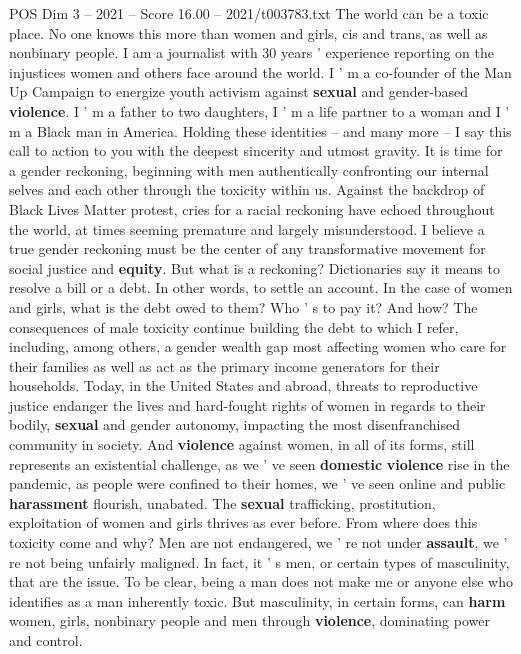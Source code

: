 \begin{textsample}{POS Dim 3 – 2021 – Score 16.00 – 2021/t003783.txt}  \label{ex:f3_pos_029}
The world can be a toxic place.
No one knows this more than women and girls, cis and trans, as well as nonbinary people.
I am a journalist with 30 years ' experience reporting on the injustices women and others face around the world.
I ' m a co-founder of the Man Up Campaign to energize youth activism against \textbf{sexual} and gender-based \textbf{violence}.
I ' m a father to two daughters, I ' m a life partner to a woman and I ' m a Black man in America.
Holding these identities -- and many more -- I say this call to action to you with the deepest sincerity and utmost gravity.
It is time for a gender reckoning, beginning with men authentically confronting our internal selves and each other through the toxicity within us.
Against the backdrop of Black Lives Matter protest, cries for a racial reckoning have echoed throughout the world, at times seeming premature and largely misunderstood.
I believe a true gender reckoning must be the center of any transformative movement for social justice and \textbf{equity}.
But what is a reckoning?
Dictionaries say it means to resolve a bill or a debt.
In other words, to settle an account.
In the case of women and girls, what is the debt owed to them?
Who ' s to pay it?
And how?
The consequences of male toxicity continue building the debt to which I refer, including, among others, a gender wealth gap most affecting women who care for their families as well as act as the primary income generators for their households.
Today, in the United States and abroad, threats to reproductive justice endanger the lives and hard-fought rights of women in regards to their bodily, \textbf{sexual} and gender autonomy, impacting the most disenfranchised community in society.
And \textbf{violence} against women, in all of its forms, still represents an existential challenge, as we ' ve seen \textbf{domestic} \textbf{violence} rise in the pandemic, as people were confined to their homes, we ' ve seen online and public \textbf{harassment} flourish, unabated.
The \textbf{sexual} trafficking, prostitution, exploitation of women and girls thrives as ever before.
From where does this toxicity come and why?
Men are not endangered, we ' re not under \textbf{assault}, we ' re not being unfairly maligned.
In fact, it ' s men, or certain types of masculinity, that are the issue.
To be clear, being a man does not make me or anyone else who identifies as a man inherently toxic.
But masculinity, in certain forms, can \textbf{harm} women, girls, nonbinary people and men through \textbf{violence}, dominating power and control.

\end{textsample}
